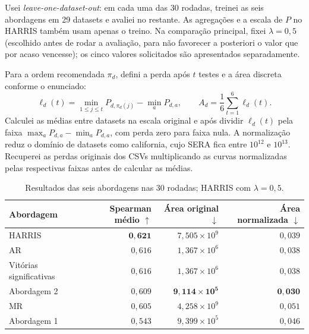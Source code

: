 \documentclass[10pt]{article}
\begin{document}
Usei \emph{leave-one-dataset-out}: em cada uma das 30 rodadas, treinei
as seis abordagens em 29 datasets e avaliei no restante. As agregações
e a escala de $P$ no HARRIS também usam apenas o treino.
Na comparação principal, fixei $\lambda=0{,}5$ (escolhido antes de rodar a
avaliação, para não favorecer a posteriori o valor que por acaso vencesse);
os cinco valores solicitados são apresentados separadamente.

Para a ordem recomendada $\pi_d$, defini a perda após $t$ testes e a
área discreta conforme o enunciado:
\[
 \ell_d(t)=\min_{1\leq j\leq t}P_{d,\pi_d(j)}-\min_a P_{d,a},
 \qquad A_d=\frac{1}{6}\sum_{t=1}^{6}\ell_d(t).
\]
Calculei as médias entre datasets na escala original e após dividir
$\ell_d(t)$ pela faixa $\max_a P_{d,a}-\min_a P_{d,a}$, com perda zero
para faixa nula. A normalização reduz o domínio de datasets como
california, cujo SERA fica entre $10^{12}$ e $10^{13}$.
Recuperei as perdas originais dos CSVs multiplicando as curvas
normalizadas pelas respectivas faixas antes de calcular as médias.

\begin{table}[H]
\centering\small
\begin{tabular}{lrrr}
\toprule
Abordagem & Spearman médio $\uparrow$ & Área original $\downarrow$ & Área normalizada $\downarrow$ \\
\midrule
HARRIS & $\mathbf{0{,}621}$ & $7{,}505\times 10^{9}$ & $0{,}039$ \\
AR & $0{,}616$ & $1{,}367\times 10^{6}$ & $0{,}038$ \\
Vitórias significativas & $0{,}616$ & $1{,}367\times 10^{6}$ & $0{,}038$ \\
Abordagem 2 & $0{,}609$ & $\mathbf{9{,}114\times 10^{5}}$ & $\mathbf{0{,}030}$ \\
MR & $0{,}605$ & $4{,}258\times 10^{9}$ & $0{,}051$ \\
Abordagem 1 & $0{,}543$ & $9{,}399\times 10^{5}$ & $0{,}046$ \\
\bottomrule
\end{tabular}
\caption{Resultados das seis abordagens nas 30 rodadas; HARRIS com $\lambda=0{,}5$.}
\label{tab:abordagens}
\end{table}
\end{document}
